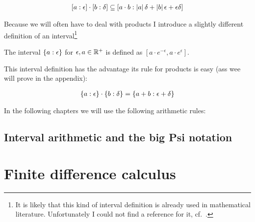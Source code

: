 \begin{align}
  \an[\epsilon]{a} \cdot \an[\delta]{b} \subseteq \an[\abs{a}\delta+\abs{b}\epsilon+\epsilon\delta]{a\cdot b}
\end{align}

Because we will often have to deal with products I introduce a slightly different definition of an interval\footnote{It is likely that this kind of interval definition is already used in mathematical literature. Unfortunately I could not find a reference for it, cf.~\cite{tampis:ean}.}

\begin{definition}
  The interval $\ean{a}$ for $\epsilon,a\in\Rplus$ is defined as $\left[a\cdot e^{-\epsilon},a\cdot e^\epsilon\right]$.
\end{definition}

\noindent This interval definition has the advantage its rule for products is easy (ass wee will prove in the appendix):

\begin{align}
  \ean[\epsilon]{a}\cdot \ean[\delta]{b} = \ean[\epsilon+\delta]{a+b}
\end{align}

In the following chapters we will use the following arithmetic rules:



\subsection{Interval arithmetic and the big Psi notation}

\section{Finite difference calculus}

